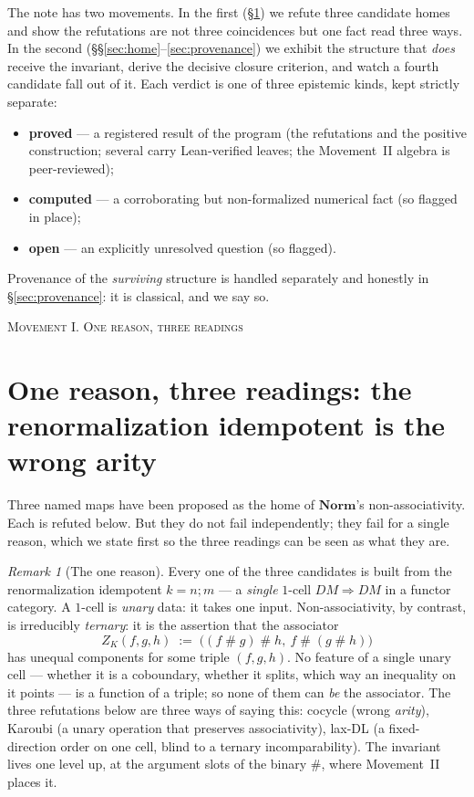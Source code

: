 \documentclass[11pt]{amsart}
\theoremstyle{plain}
\theoremstyle{definition}
\theoremstyle{remark}
\newtheorem{remark}[theorem]{Remark}
\newcommand{\Norm}{\mathbf{Norm}}
\newcommand{\comp}{\mathbin{;}}
\newcommand{\sh}{\mathbin{\#}}
\begin{document}
The note has two movements. In the first (\S\ref{sec:onereason}) we refute three candidate homes and
show the refutations are not three coincidences but one fact read three ways. In the second
(\S\S\ref{sec:home}--\ref{sec:provenance}) we exhibit the structure that \emph{does} receive the
invariant, derive the decisive closure criterion, and watch a fourth candidate fall out of it. Each
verdict is one of three epistemic kinds, kept strictly separate:
\begin{itemize}
  \item \textbf{proved} --- a registered result of the program (the refutations and the positive
        construction; several carry Lean-verified leaves; the Movement~II algebra is peer-reviewed);
  \item \textbf{computed} --- a corroborating but non-formalized numerical fact (so flagged in place);
  \item \textbf{open} --- an explicitly unresolved question (so flagged).
\end{itemize}
Provenance of the \emph{surviving} structure is handled separately and honestly in
\S\ref{sec:provenance}: it is classical, and we say so.

\bigskip
\begin{center}\textsc{Movement I. One reason, three readings}\end{center}

\section{One reason, three readings: the renormalization idempotent is the wrong arity}
\label{sec:onereason}

Three named maps have been proposed as the home of $\Norm$'s non-associativity. Each is refuted
below. But they do not fail independently; they fail for a single reason, which we state first so the
three readings can be seen as what they are.

\begin{remark}[The one reason]
\label{rem:onereason}
Every one of the three candidates is built from the renormalization idempotent $k=n\comp m$ --- a
\emph{single} $1$-cell $DM\Rightarrow DM$ in a functor category. A $1$-cell is \emph{unary} data: it
takes one input. Non-associativity, by contrast, is irreducibly \emph{ternary}: it is the assertion
that the associator
\[
  Z_{K}(f,g,h)\;:=\;\big((f\sh g)\sh h,\ f\sh(g\sh h)\big)
\]
has unequal components for some triple $(f,g,h)$. No feature of a single unary cell --- whether it is
a coboundary, whether it splits, which way an inequality on it points --- is a function of a triple;
so none of them can \emph{be} the associator. The three refutations below are three ways of saying
this: cocycle (wrong \emph{arity}), Karoubi (a unary operation that preserves associativity), lax-DL
(a fixed-direction order on one cell, blind to a ternary incomparability). The invariant lives one
level up, at the argument slots of the binary $\sh$, where Movement~II places it.
\end{remark}
\end{document}
